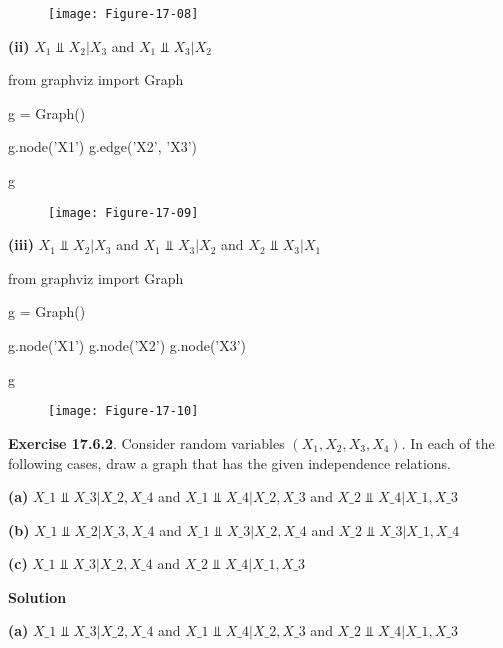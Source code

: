 \begin{figure}[H]
\centering
\texttt{[image: Figure-17-08]}
\end{figure}

\textbf{(ii)} \(X_{1} \text{ ⫫ } X_{2} | X_{3}\) and
\(X_{1} \text{ ⫫ } X_{3} | X_{2}\)

\begin{python}
from graphviz import Graph

g = Graph()

g.node('X1')
g.edge('X2', 'X3')

g
\end{python}
 
\begin{figure}[H]
\centering
\texttt{[image: Figure-17-09]}
\end{figure}

\textbf{(iii)} \(X_{1} \text{ ⫫ } X_{2} | X_{3}\) and
\(X_{1} \text{ ⫫ } X_{3} | X_{2}\) and \(X_{2} \text{ ⫫ } X_{3} | X_{1}\)

\begin{python}
from graphviz import Graph

g = Graph()

g.node('X1')
g.node('X2')
g.node('X3')

g
\end{python}
 
\begin{figure}[H]
\centering
\texttt{[image: Figure-17-10]}
\end{figure}

\textbf{Exercise 17.6.2}. Consider random variables
\((X_{1}, X_{2}, X_{3}, X_{4})\). In each of the following cases, draw a graph
that has the given independence relations.

\textbf{(a)} $X\_{1} \text{ ⫫ } X\_{3} |{} X\_{2}, X\_{4} $ and $X\_{1}
\text{ ⫫ } X\_{4} |{} X\_{2}, X\_{3} $ and $X\_{2} \text{ ⫫ } X\_{4}
|{} X\_{1}, X\_{3} $

\textbf{(b)} $X\_{1} \text{ ⫫ } X\_{2} |{} X\_{3}, X\_{4} $ and $X\_{1}
\text{ ⫫ } X\_{3} |{} X\_{2}, X\_{4} $ and $X\_{2} \text{ ⫫ } X\_{3}
|{} X\_{1}, X\_{4} $

\textbf{(c)} $X\_{1} \text{ ⫫ } X\_{3} |{} X\_{2}, X\_{4} $ and $X\_{2}
\text{ ⫫ } X\_{4} |{} X\_{1}, X\_{3} $

\textbf{Solution}

\textbf{(a)} $X\_{1} \text{ ⫫ } X\_{3} |{} X\_{2}, X\_{4} $ and $X\_{1}
\text{ ⫫ } X\_{4} |{} X\_{2}, X\_{3} $ and $X\_{2} \text{ ⫫ } X\_{4}
|{} X\_{1}, X\_{3} $

